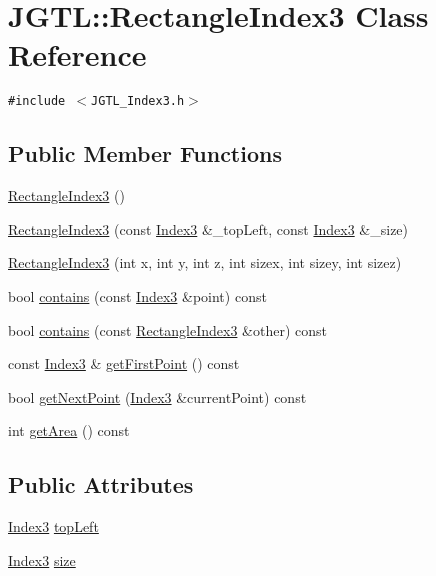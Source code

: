 \hypertarget{class_j_g_t_l_1_1_rectangle_index3}{
\section{JGTL::Rectangle\-Index3 Class Reference}
\label{class_j_g_t_l_1_1_rectangle_index3}
}
{\tt \#include $<$JGTL\_\-Index3.h$>$}

\subsection*{Public Member Functions}
\begin{CompactItemize}
\item 
\hyperlink{class_j_g_t_l_1_1_rectangle_index3_c93fa463cd6badcc6cb1d8b16134fa32}{Rectangle\-Index3} ()
\item 
\hyperlink{class_j_g_t_l_1_1_rectangle_index3_f1661df1eeb1281cbcb639bbd6b3b583}{Rectangle\-Index3} (const \hyperlink{class_j_g_t_l_1_1_index3}{Index3} \&\_\-top\-Left, const \hyperlink{class_j_g_t_l_1_1_index3}{Index3} \&\_\-size)
\item 
\hyperlink{class_j_g_t_l_1_1_rectangle_index3_71b5f48e90fdf1e3655a706b86555f5b}{Rectangle\-Index3} (int x, int y, int z, int sizex, int sizey, int sizez)
\item 
bool \hyperlink{class_j_g_t_l_1_1_rectangle_index3_684d5b35b495248a08c58934733708d7}{contains} (const \hyperlink{class_j_g_t_l_1_1_index3}{Index3} \&point) const 
\item 
bool \hyperlink{class_j_g_t_l_1_1_rectangle_index3_40566e129adc34414f121d381b0e9778}{contains} (const \hyperlink{class_j_g_t_l_1_1_rectangle_index3}{Rectangle\-Index3} \&other) const 
\item 
const \hyperlink{class_j_g_t_l_1_1_index3}{Index3} \& \hyperlink{class_j_g_t_l_1_1_rectangle_index3_8d6af8973681aa05eef77cc81ab5423d}{get\-First\-Point} () const
\item 
bool \hyperlink{class_j_g_t_l_1_1_rectangle_index3_a81e5102d4fe3a7295ed65893eff8c65}{get\-Next\-Point} (\hyperlink{class_j_g_t_l_1_1_index3}{Index3} \&current\-Point) const 
\item 
int \hyperlink{class_j_g_t_l_1_1_rectangle_index3_fa79fc376e7ba91e790bd613a77a8796}{get\-Area} () const
\end{CompactItemize}
\subsection*{Public Attributes}
\begin{CompactItemize}
\item 
\hyperlink{class_j_g_t_l_1_1_index3}{Index3} \hyperlink{class_j_g_t_l_1_1_rectangle_index3_3b7944ac74165c86d84e249348d123a0}{top\-Left}
\item 
\hyperlink{class_j_g_t_l_1_1_index3}{Index3} \hyperlink{class_j_g_t_l_1_1_rectangle_index3_a6c4a7cd479ca23b7a3063e2abc1c6aa}{size}
\end{CompactItemize}


